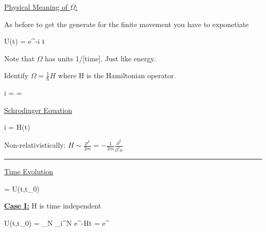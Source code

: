 {\underline{Physical Meaning of $\Omega$:}

As before to get the generate for the finite movement you have to exponetiate

\be
U(t) = e^{-i \Omega t}
\ee

Note that $\Omega$ has units 1/[time].  
Just like energy.

Identify $\Omega = \frac{1}{\hbar}H$  where H is the Hamiltonian operator.


\be
i \ket{\psi} = \Omega \ket{\psi} =  \ket{\psi}
\ee


\underline{Schrodinger Equation}

\be
i \ket{\psi} = H(t) \ket{\psi}
\ee

Non-relativistically:  $H \sim \frac{p^2}{2m} = -\frac{1}{2m} \frac{\partial^2}{\partial^2 x}$

\noindent\rule{\textwidth}{1pt}

\underline{Time Evolution}

\be
{} = U(t,t_0) 
\ee


\textbf{\underline{Case I:}} H is time independent

\be
U(t,t_0) = \lim_{N\rightarrow\infty} \prod\limits_{i}^{N} e^{-H\Delta t}  = e^{}
\ee


} 


